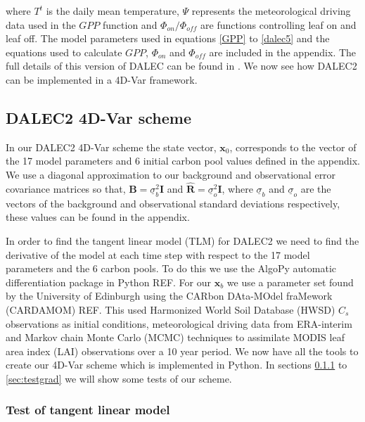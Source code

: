 \documentclass[11pt]{article}
\begin{document}
where $T^{t}$ is the daily mean temperature, $\Psi$ represents the meteorological driving data used in the $GPP$ function and $\Phi_{on} / \Phi_{off}$ are functions controlling leaf on and leaf off. The model parameters used in equations \ref{GPP} to \ref{dalec5} and the equations used to calculate $GPP$, $\Phi_{on}$ and $\Phi_{off}$ are included in the appendix. The full details of this version of DALEC can be found in \cite{Bloom2014}. We now see how DALEC2 can be implemented in a 4D-Var framework.


\subsection{DALEC2 4D-Var scheme}

In our DALEC2 4D-Var scheme the state vector, $\textbf{x}_0$, corresponds to the vector of the 17 model parameters and 6 initial carbon pool values defined in the appendix. We use a diagonal approximation to our background and observational error covariance matrices so that, 
$\textbf{B}=\underline{\sigma}_b^2 \textbf{I}$ and $\hat{\textbf{R}}=\underline{\sigma}_o^2 \textbf{I}$,
where $\underline{\sigma}_b$ and $\underline{\sigma}_o$ are the vectors of the background and observational standard deviations respectively, these values can be found in the appendix.

In order to find the tangent linear model (TLM) for DALEC2 we need to find the derivative of the model at each time step with respect to the 17 model parameters and the 6 carbon pools. To do this we use the AlgoPy automatic differentiation package in Python REF. For our $\textbf{x}_b$ we use a parameter set found by the University of Edinburgh using the CARbon DAta-MOdel fraMework (CARDAMOM) REF. This used Harmonized World Soil Database (HWSD) $C_{s}$ observations as initial conditions, meteorological driving data from ERA-interim and Markov chain Monte Carlo (MCMC) techniques to assimilate MODIS leaf area index (LAI) observations over a 10 year period. We now have all the tools to create our 4D-Var scheme which is implemented in Python. In sections \ref{sec:testtlm} to \ref{sec:testgrad} we will show some tests of our scheme.

\subsubsection{Test of tangent linear model} \label{sec:testtlm}
\end{document}
